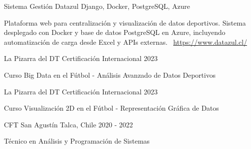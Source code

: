 \documentclass[]{awesome-cv}
\begin{document}
\begin{cventries}
	\vspace{-3mm}
	\cventry
	{}
	{Sistema Gestión Datazul \vspace{-5mm}}
	{Django, Docker, PostgreSQL, Azure \vspace{-5mm}}
	{}
	{\begin{cvsectionnormaltext}
		\item {Plataforma web para centralización y visualización de datos deportivos. Sistema desplegado con Docker y base de datos PostgreSQL en Azure, incluyendo automatización de carga desde Excel y APIs externas.
		\newline \faLink\ \href{https://www.datazul.cl/}{https://www.datazul.cl/}}
	\end{cvsectionnormaltext}}

		\vspace{-3mm}
	\cventry
	{}
	
\end{cventries}

\vspace{4mm}
\begin{cventries}
	\vspace{-3mm}
	\cventry
	{}
	{La Pizarra del DT \vspace{-5mm}}
	{Certificación Internacional \vspace{-5mm}}
	{2023 \vspace{-5mm}}
	{\begin{cvsectionnormaltext} 
		\item{Curso Big Data en el Fútbol - Análisis Avanzado de Datos Deportivos}
	\end{cvsectionnormaltext}}

	\vspace{-3mm}
	\cventry
	{}
	{La Pizarra del DT \vspace{-5mm}}
	{Certificación Internacional \vspace{-5mm}}
	{2023 \vspace{-5mm}}
	{\begin{cvsectionnormaltext} 
		\item{Curso Visualización 2D en el Fútbol - Representación Gráfica de Datos}
	\end{cvsectionnormaltext}}

	\vspace{-3mm}
	\cventry
	{}
	{CFT San Agustín \vspace{-5mm}}
	{Talca, Chile \vspace{-5mm}}
	{2020 - 2022 \vspace{-5mm}}
	{\begin{cvsectionnormaltext} 
		\item{Técnico en Análisis y Programación de Sistemas}
	\end{cvsectionnormaltext}}
\end{cventries}
\end{document}

